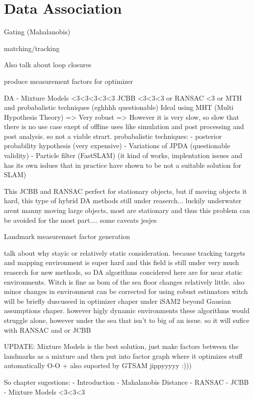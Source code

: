 \section{Data Association}


Gating (Mahalanobis)

matching/tracking

Also talk about loop closures

produce measurement factors for optimizer

DA - Mixture Models <3<3<3<3<3 JCBB <3<3<3 or RANSAC <3 or MTH and probabalistic techniques (eghhhh questionable)
Ideal using MHT (Multi Hypothesis Theory) => Very robust => However it is very slow, so slow that there is no use case exept of offline uses like simulation and post processing and post analysis. so not a viable strart.
probabalistic techniques:
  - posterior probability hypothesis (very expensive) 
  - Variations of JPDA (questionable validity)
  - Particle filter (FastSLAM) (it kind of works, implentation issues and has its own isdues that in practice have shown to be not a suitable solution for SLAM)

This JCBB and RANSAC perfect for stationary objects, but if moving objects it hard, this type of hybrid DA methods still under reaserch... luckily underwater arent manny moving large objects, most are stationary and thus this problem can be avoided for the most part.... some caveats jesjes

Landmark measuremnet factor generation

talk about why stayic or relatively static consideration. because tracking targets and mapping environment is super hard and this field is still under very much reaserch for new methods, so DA algorithms concidered here are for near static environments. Witch is fine as bom of the sea floor changes relatively little. also minor changes in environment can be corrected for using robust estimators witch will be briefly duscuseed in optimizer chaper under iSAM2 beyond Gausian assumptions chaper. however higly dynamic environments these algorithms would struggle alone, however under the sea that isn't to big of an issue. so it will sufice with RANSAC and or JCBB


UPDATE: Mixture Models is the best solution, just make factors between the landmarks as a mixture and then put into factor graph where it optimizes stuff automatically O-O + also suported by GTSAM jippyyyyy :)))


So chapter sugestions:
- Introduction
- Mahalanobis Distance
- RANSAC
- JCBB
- Mixture Models <3<3<3